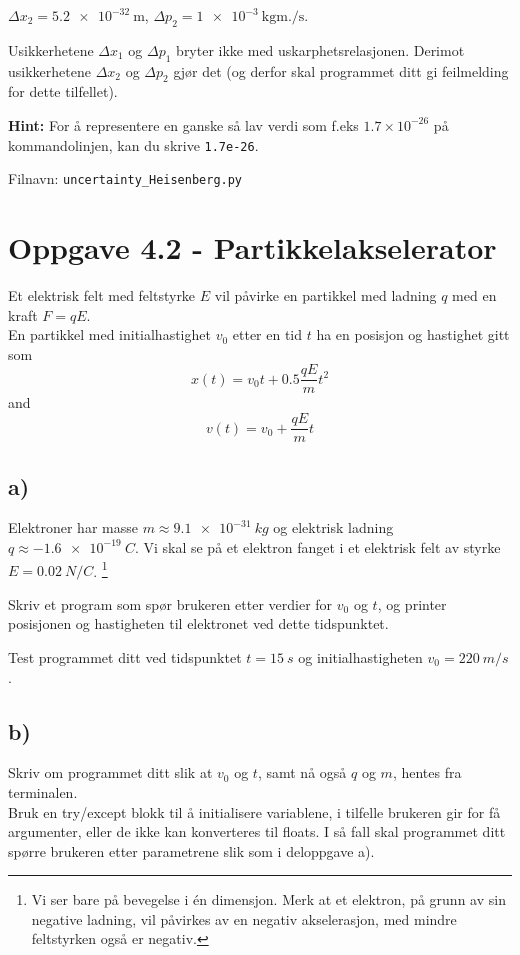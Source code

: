 \documentclass[10pt,a4paper]{article}
\begin{document}
$\Delta x_2 = \SI{5.2e-32}{\m}$, $\Delta p_2 = \SI{1e-3}{\kg \meter .\per \second}$. 
 
Usikkerhetene
$\Delta x_1$ og $\Delta p_1$ bryter ikke med uskarphetsrelasjonen. Derimot usikkerhetene $\Delta x_2$ og $\Delta p_2$ gjør det (og derfor skal programmet ditt gi feilmelding for dette tilfellet). 
 
\textbf{Hint:} For å representere en ganske så lav verdi som f.eks $1.7\times 10^{-26}$ på kommandolinjen, kan du skrive \texttt{1.7e-26}. 
 
Filnavn: \texttt{uncertainty\_Heisenberg.py} 
 



\section*{Oppgave 4.2 - Partikkelakselerator}

Et elektrisk felt med feltstyrke $E$ vil påvirke en partikkel med ladning $q$ med en kraft $F = qE$.\\
En partikkel med initialhastighet $v_0$ etter en tid $t$ ha en posisjon og hastighet gitt som
\[	x(t) = v_0t + 0.5\frac{q E}{m} t^2
\]
and
\[	v(t) = v_0 + \frac{q E}{m} t
\]
 
\subsection*{a)}
Elektroner har masse $m\approx \SI{9.1e-31}{kg}$ og elektrisk ladning $q \approx \SI{-1.6e-19}{C}$. Vi skal se på et elektron fanget i et elektrisk felt av styrke $E = \SI{0.02}{N/C}$. \footnote{Vi ser bare på bevegelse i én dimensjon. Merk at et elektron, på grunn av sin negative ladning, vil påvirkes av en negativ akselerasjon, med mindre feltstyrken også er negativ.}
 
Skriv et program som spør brukeren etter verdier for $v_0$ og $t$, og printer posisjonen og hastigheten til elektronet ved dette tidspunktet.
 
Test programmet ditt ved tidspunktet $t = \SI{15}{s}$ og initialhastigheten $v_0 = \SI{220}{m/s}$.
 
\subsection*{b)}
Skriv om programmet ditt slik at $v_0$ og $t$, samt nå også $q$ og $m$, hentes fra terminalen.\\
Bruk en try/except blokk til å initialisere variablene, i tilfelle brukeren gir for få argumenter, eller de ikke kan konverteres til floats. I så fall skal programmet ditt spørre brukeren etter parametrene slik som i deloppgave a).
 
\end{document}
